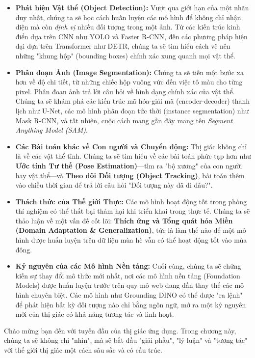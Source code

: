 \begin{itemize}
	\item \textbf{Phát hiện Vật thể (Object Detection):} Vượt qua giới hạn của một nhãn duy nhất, chúng ta sẽ học cách huấn luyện các mô hình để không chỉ nhận diện mà còn \textit{định vị} nhiều đối tượng trong một ảnh. Từ các kiến trúc kinh điển dựa trên CNN như YOLO và Faster R-CNN, đến các phương pháp hiện đại dựa trên Transformer như DETR, chúng ta sẽ tìm hiểu cách vẽ nên những "khung hộp" (bounding boxes) chính xác xung quanh mọi vật thể.
	
	\item \textbf{Phân đoạn Ảnh (Image Segmentation):} Chúng ta sẽ tiến một bước xa hơn về độ chi tiết, từ những chiếc hộp vuông vức đến việc tô màu cho từng pixel. Phân đoạn ảnh trả lời câu hỏi về hình dạng chính xác của vật thể. Chúng ta sẽ khám phá các kiến trúc mã hóa-giải mã (encoder-decoder) thanh lịch như U-Net, các mô hình phân đoạn tức thời (instance segmentation) như Mask R-CNN, và tất nhiên, cuộc cách mạng gần đây mang tên \textit{Segment Anything Model (SAM)}.
	
	\item \textbf{Các Bài toán khác về Con người và Chuyển động:} Thị giác không chỉ là về các vật thể tĩnh. Chúng ta sẽ tìm hiểu về các bài toán phức tạp hơn như \textbf{Ước tính Tư thế (Pose Estimation)}—tìm ra "bộ xương" của con người hay vật thể—và \textbf{Theo dõi Đối tượng (Object Tracking)}, bài toán thêm vào chiều thời gian để trả lời câu hỏi "Đối tượng này đã đi đâu?".
	
	\item \textbf{Thách thức của Thế giới Thực:} Các mô hình hoạt động tốt trong phòng thí nghiệm có thể thất bại thảm hại khi triển khai trong thực tế. Chúng ta sẽ thảo luận về một vấn đề cốt lõi: \textbf{Thích ứng và Tổng quát hóa Miền (Domain Adaptation \& Generalization)}, tức là làm thế nào để một mô hình được huấn luyện trên dữ liệu mùa hè vẫn có thể hoạt động tốt vào mùa đông.
	
	\item \textbf{Kỷ nguyên của các Mô hình Nền tảng:} Cuối cùng, chúng ta sẽ chứng kiến sự thay đổi mô thức mới nhất, nơi các mô hình nền tảng (Foundation Models) được huấn luyện trước trên quy mô web đang dần thay thế các mô hình chuyên biệt. Các mô hình như Grounding DINO có thể được "ra lệnh" để phát hiện bất kỳ đối tượng nào chỉ bằng ngôn ngữ, mở ra một kỷ nguyên mới của thị giác có khả năng tương tác và linh hoạt.
\end{itemize}

Chào mừng bạn đến với tuyến đầu của thị giác ứng dụng. Trong chương này, chúng ta sẽ không chỉ "nhìn", mà sẽ bắt đầu "giải phẫu", "lý luận" và "tương tác" với thế giới thị giác một cách sâu sắc và có cấu trúc.